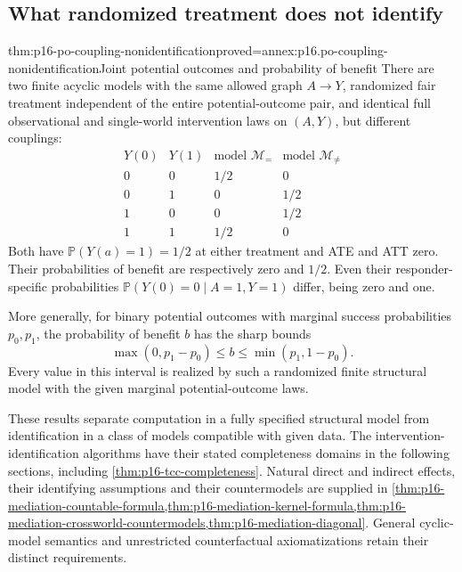 \subsection{What randomized treatment does not identify}

\begin{hbtheorem}{thm:p16-po-coupling-nonidentification}{proved=annex:p16.po-coupling-nonidentification}{Joint potential outcomes and probability of benefit}
There are two finite acyclic models with the same allowed graph
\(A\to Y\), randomized fair treatment independent of the entire
potential-outcome pair, and identical full observational and
single-world intervention laws on \((A,Y)\), but different couplings:
\[
\begin{array}{cc|cc}
 Y(0)&Y(1)&\text{model }\mathcal M_{=}&\text{model }\mathcal M_{\ne}\\\hline
 0&0&1/2&0\\
 0&1&0&1/2\\
 1&0&0&1/2\\
 1&1&1/2&0
\end{array}
\]
Both have \(\mathbb P(Y(a)=1)=1/2\) at either treatment and
ATE and ATT zero. Their probabilities of benefit are respectively
zero and \(1/2\). Even their responder-specific probabilities
\(\mathbb P(Y(0)=0\mid A=1,Y=1)\) differ, being zero and one.

More generally, for binary potential outcomes with marginal success
probabilities \(p_0,p_1\), the probability of benefit \(b\)
has the sharp bounds
\[
 \max(0,p_1-p_0)\leq b\leq\min(p_1,1-p_0).
\]
Every value in this interval is realized by such a randomized finite
structural model with the given marginal potential-outcome laws.
\end{hbtheorem}

These results separate computation in a fully specified structural
model from identification in a class of models compatible with given
data. The intervention-identification algorithms have their stated
completeness domains in the following sections, including
\cref{thm:p16-tcc-completeness}.
Natural direct and indirect effects, their identifying assumptions
and their countermodels are supplied in
\cref{thm:p16-mediation-countable-formula,thm:p16-mediation-kernel-formula,thm:p16-mediation-crossworld-countermodels,thm:p16-mediation-diagonal}.
General cyclic-model semantics and unrestricted counterfactual
axiomatizations retain their distinct requirements.
